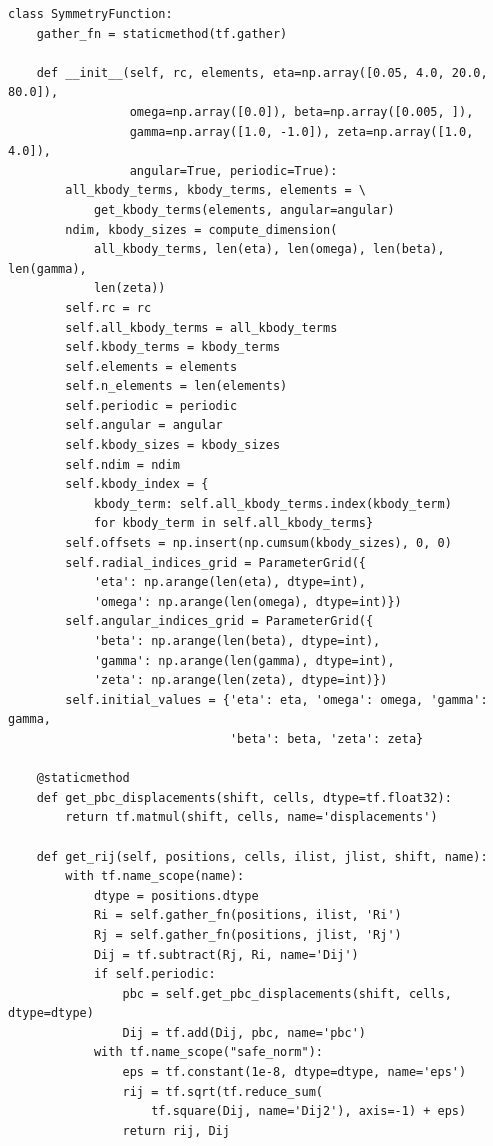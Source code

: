 \documentclass[preprint]{revtex4-2}
\begin{document}
\begin{verbatim}
class SymmetryFunction:
    gather_fn = staticmethod(tf.gather)

    def __init__(self, rc, elements, eta=np.array([0.05, 4.0, 20.0, 80.0]),
                 omega=np.array([0.0]), beta=np.array([0.005, ]),
                 gamma=np.array([1.0, -1.0]), zeta=np.array([1.0, 4.0]),
                 angular=True, periodic=True):
        all_kbody_terms, kbody_terms, elements = \
            get_kbody_terms(elements, angular=angular)
        ndim, kbody_sizes = compute_dimension(
            all_kbody_terms, len(eta), len(omega), len(beta), len(gamma),
            len(zeta))
        self.rc = rc
        self.all_kbody_terms = all_kbody_terms
        self.kbody_terms = kbody_terms
        self.elements = elements
        self.n_elements = len(elements)
        self.periodic = periodic
        self.angular = angular
        self.kbody_sizes = kbody_sizes
        self.ndim = ndim
        self.kbody_index = {
            kbody_term: self.all_kbody_terms.index(kbody_term)
            for kbody_term in self.all_kbody_terms}
        self.offsets = np.insert(np.cumsum(kbody_sizes), 0, 0)
        self.radial_indices_grid = ParameterGrid({
            'eta': np.arange(len(eta), dtype=int),
            'omega': np.arange(len(omega), dtype=int)})
        self.angular_indices_grid = ParameterGrid({
            'beta': np.arange(len(beta), dtype=int),
            'gamma': np.arange(len(gamma), dtype=int),
            'zeta': np.arange(len(zeta), dtype=int)})
        self.initial_values = {'eta': eta, 'omega': omega, 'gamma': gamma,
                               'beta': beta, 'zeta': zeta}

    @staticmethod
    def get_pbc_displacements(shift, cells, dtype=tf.float32):
        return tf.matmul(shift, cells, name='displacements')

    def get_rij(self, positions, cells, ilist, jlist, shift, name):
        with tf.name_scope(name):
            dtype = positions.dtype
            Ri = self.gather_fn(positions, ilist, 'Ri')
            Rj = self.gather_fn(positions, jlist, 'Rj')
            Dij = tf.subtract(Rj, Ri, name='Dij')
            if self.periodic:
                pbc = self.get_pbc_displacements(shift, cells, dtype=dtype)
                Dij = tf.add(Dij, pbc, name='pbc')
            with tf.name_scope("safe_norm"):
                eps = tf.constant(1e-8, dtype=dtype, name='eps')
                rij = tf.sqrt(tf.reduce_sum(
                    tf.square(Dij, name='Dij2'), axis=-1) + eps)
                return rij, Dij


\end{verbatim}
\end{document}
